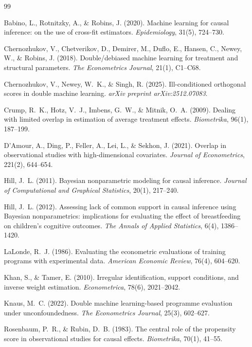 \documentclass[12pt]{article}
\begin{document}
\newpage
\begin{thebibliography}{99}

Babino, L., Rotnitzky, A., \& Robins, J. (2020).
Machine learning for causal inference: on the use of cross-fit estimators.
\textit{Epidemiology}, 31(5), 724--730.

Chernozhukov, V., Chetverikov, D., Demirer, M., Duflo, E., Hansen, C., Newey, W., \& Robins, J. (2018).
Double/debiased machine learning for treatment and structural parameters.
\textit{The Econometrics Journal}, 21(1), C1--C68.

Chernozhukov, V., Newey, W.~K., \& Singh, R. (2025).
Ill-conditioned orthogonal scores in double machine learning.
\textit{arXiv preprint arXiv:2512.07083}.

Crump, R.~K., Hotz, V.~J., Imbens, G.~W., \& Mitnik, O.~A. (2009).
Dealing with limited overlap in estimation of average treatment effects.
\textit{Biometrika}, 96(1), 187--199.

D'Amour, A., Ding, P., Feller, A., Lei, L., \& Sekhon, J. (2021).
Overlap in observational studies with high-dimensional covariates.
\textit{Journal of Econometrics}, 221(2), 644--654.

Hill, J.~L. (2011).
Bayesian nonparametric modeling for causal inference.
\textit{Journal of Computational and Graphical Statistics}, 20(1), 217--240.

Hill, J.~L. (2012).
Assessing lack of common support in causal inference using Bayesian nonparametrics: implications for evaluating the effect of breastfeeding on children's cognitive outcomes.
\textit{The Annals of Applied Statistics}, 6(4), 1386--1420.

LaLonde, R.~J. (1986).
Evaluating the econometric evaluations of training programs with experimental data.
\textit{American Economic Review}, 76(4), 604--620.

Khan, S., \& Tamer, E. (2010).
Irregular identification, support conditions, and inverse weight estimation.
\textit{Econometrica}, 78(6), 2021--2042.

Knaus, M.~C. (2022).
Double machine learning-based programme evaluation under unconfoundedness.
\textit{The Econometrics Journal}, 25(3), 602--627.

Rosenbaum, P.~R., \& Rubin, D.~B. (1983).
The central role of the propensity score in observational studies for causal effects.
\textit{Biometrika}, 70(1), 41--55.

\end{thebibliography}
\end{document}
